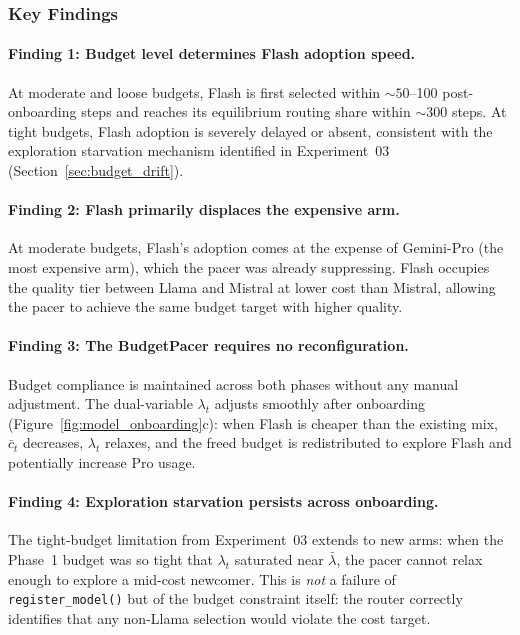 \subsubsection{Key Findings}


\paragraph{Finding 1: Budget level determines Flash adoption speed.}
At moderate and loose budgets, Flash is first selected within
${\sim}50$--100 post-onboarding steps and reaches its equilibrium
routing share within ${\sim}300$ steps.
At tight budgets, Flash adoption is severely delayed or absent,
consistent with the exploration starvation mechanism identified in
Experiment~03 (Section~\ref{sec:budget_drift}).

\paragraph{Finding 2: Flash primarily displaces the expensive arm.}
At moderate budgets, Flash's adoption comes at the expense of
Gemini-Pro (the most expensive arm), which the pacer was already
suppressing.  Flash occupies the quality tier between Llama and
Mistral at lower cost than Mistral, allowing the pacer to achieve
the same budget target with higher quality.

\paragraph{Finding 3: The BudgetPacer requires no reconfiguration.}
Budget compliance is maintained across both phases without any manual
adjustment.  The dual-variable $\lambda_t$ adjusts smoothly after
onboarding (Figure~\ref{fig:model_onboarding}c): when Flash is cheaper
than the existing mix, $\bar{c}_t$ decreases, $\lambda_t$ relaxes, and
the freed budget is redistributed to explore Flash and potentially
increase Pro usage.

\paragraph{Finding 4: Exploration starvation persists across onboarding.}
The tight-budget limitation from Experiment~03 extends to new arms:
when the Phase~1 budget was so tight that $\lambda_t$ saturated near
$\bar\lambda$, the pacer cannot relax enough to explore a mid-cost
newcomer.  This is \emph{not} a failure of \texttt{register\_model()}
but of the budget constraint itself: the router correctly identifies
that any non-Llama selection would violate the cost target.

